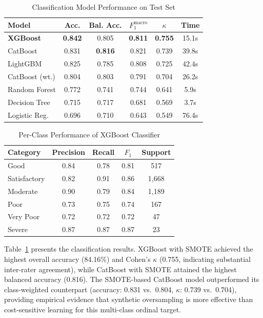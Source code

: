 \documentclass[conference]{IEEEtran}
\begin{document}
\begin{table}[!t]
\centering
\caption{Classification Model Performance on Test Set}
\label{tab:classification}
\begin{tabular}{lccccc}
\toprule
\textbf{Model} & \textbf{Acc.} & \textbf{Bal. Acc.} & \textbf{$F_1^{\text{macro}}$} & \textbf{$\kappa$} & \textbf{Time} \\
\midrule
\textbf{XGBoost}  & \textbf{0.842} & 0.805 & \textbf{0.811} & \textbf{0.755} & 15.1s \\
CatBoost           & 0.831 & \textbf{0.816} & 0.821 & 0.739 & 39.8s \\
LightGBM           & 0.825 & 0.785 & 0.808 & 0.725 & 42.4s \\
CatBoost (wt.)     & 0.804 & 0.803 & 0.791 & 0.704 & 26.2s \\
Random Forest      & 0.772 & 0.741 & 0.744 & 0.641 & 5.9s \\
Decision Tree      & 0.715 & 0.717 & 0.681 & 0.569 & 3.7s \\
Logistic Reg.      & 0.696 & 0.710 & 0.643 & 0.549 & 76.4s \\
\bottomrule
\end{tabular}
\end{table}

\begin{table}[!t]
\centering
\caption{Per-Class Performance of XGBoost Classifier}
\label{tab:perclass}
\begin{tabular}{lcccc}
\toprule
\textbf{Category} & \textbf{Precision} & \textbf{Recall} & \textbf{$F_1$} & \textbf{Support} \\
\midrule
Good           & 0.84 & 0.78 & 0.81 & 517 \\
Satisfactory   & 0.82 & 0.91 & 0.86 & 1{,}668 \\
Moderate       & 0.90 & 0.79 & 0.84 & 1{,}189 \\
Poor           & 0.73 & 0.75 & 0.74 & 167 \\
Very Poor      & 0.72 & 0.72 & 0.72 & 47 \\
Severe         & 0.87 & 0.87 & 0.87 & 23 \\
\bottomrule
\end{tabular}
\end{table}

Table~\ref{tab:classification} presents the classification results. XGBoost with SMOTE achieved the highest overall accuracy (84.16\%) and Cohen's $\kappa$ (0.755, indicating substantial inter-rater agreement), while CatBoost with SMOTE attained the highest balanced accuracy (0.816). The SMOTE-based CatBoost model outperformed its class-weighted counterpart (accuracy: 0.831 vs.\ 0.804, $\kappa$: 0.739 vs.\ 0.704), providing empirical evidence that synthetic oversampling is more effective than cost-sensitive learning for this multi-class ordinal target.
\end{document}
